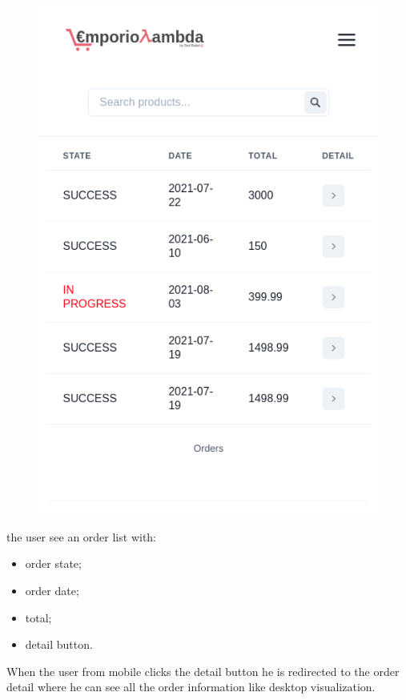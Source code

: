\begin{itemize}
\begin{figure}[!ht]
              \includegraphics[scale=0.3]{../../../../Images/userManual/orderMobile.png}
              \centering
          \end{figure}
          the user see an order list with:
          \begin{itemize}
              \item order state;
              \item order date;
              \item total;
              \item detail button.
          \end{itemize}
          When the user from mobile clicks the detail button he is redirected to the order detail where he can see all the order information like desktop visualization.
          \begin{figure}[!ht]

\end{figure}
\end{itemize}
